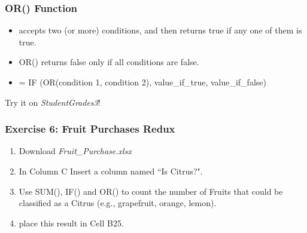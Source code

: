\documentclass[12pt]{beamer}
\begin{document}
\begin{frame}
	\frametitle{OR() Function}
	\begin{itemize}
	\item accepts two (or more) conditions, and then returns true if any one of them is true.
	\item OR() returns false only if all conditions are false.
	\item = IF (OR(condition 1, condition 2), value\_if\_true, value\_if\_false)
	\end{itemize}
\bigskip
Try it on \textit{StudentGrades3}!
\end{frame}
\begin{frame}
	\frametitle{Exercise 6: Fruit Purchases Redux}
	\begin{enumerate}
		\item Download \textit{Fruit\_Purchase.xlsx}
		\item In Column C Insert a column named ``Is Citrus?". 
		\item Use  SUM(), IF() and OR() to count the number of Fruits that could be classified as a Citrus (e.g., grapefruit, orange, lemon).
		\item place this result in Cell B25.
	\end{enumerate}
\end{frame}
\end{document}
